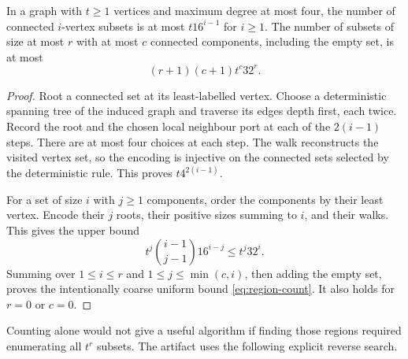 \begin{lemma}\label{lem:connected-count}
In a graph with $t\ge1$ vertices and maximum degree at most four, the number
of connected $i$-vertex subsets is at most $t16^{i-1}$ for $i\ge1$.
The number of subsets of size at most $r$ with at most $c$ connected
components, including the empty set, is at most
\begin{equation}\label{eq:region-count}
 (r+1)(c+1)t^c32^r.
\end{equation}
\end{lemma}
\begin{proof}
Root a connected set at its least-labelled vertex. Choose a deterministic
spanning tree of the induced graph and traverse its edges depth first,
each twice. Record the root and the chosen local neighbour port at each
of the $2(i-1)$ steps. There are at most four choices at each step. The
walk reconstructs the visited vertex set, so the encoding is injective
on the connected sets selected by the deterministic rule. This proves
$t4^{2(i-1)}$.

For a set of size $i$ with $j\ge1$ components, order the components by their
least vertex. Encode their $j$ roots, their positive sizes summing to $i$,
and their walks. This gives the upper bound
\[
 t^j\binom{i-1}{j-1}16^{i-j}\le t^j32^i.
\]
Summing over $1\le i\le r$ and $1\le j\le\min(c,i)$, then adding the empty
set, proves the intentionally coarse uniform bound
\eqref{eq:region-count}. It also holds for $r=0$ or $c=0$.
\end{proof}

Counting alone would not give a useful algorithm if finding those regions
required enumerating all $t^r$ subsets. The artifact uses the following
explicit reverse search.

